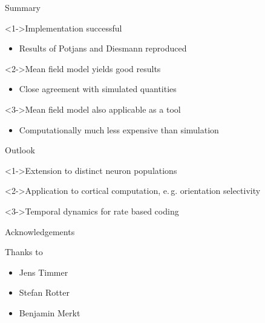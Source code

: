 \documentclass[xcolor=x11names,compress]{beamer}
\renewcommand{\(}{\begin{columns}}
\renewcommand{\)}{\end{columns}}
\newcommand{\<}[1]{\begin{column}{#1}}
\renewcommand{\>}{\end{column}}
\begin{document}
\begin{frame}[t]{Summary}
    \begin{block}<1->{Implementation successful}
        \begin{itemize}
            \item 
        Results of Potjans and Diesmann reproduced
        \end{itemize}
    \end{block}
    \vfill
    \begin{block}<2->{Mean field model yields good results}
        \begin{itemize}
            \item 
        Close agreement with simulated quantities
        \end{itemize}
    \end{block}
    \vfill
    \begin{block}<3->{Mean field model also applicable as a tool}
        \begin{itemize}
            \item 
        Computationally much less expensive than simulation
        \end{itemize}
    \end{block}
\end{frame}

\begin{frame}[t]{Outlook}
    \begin{block}<1->{Extension to distinct neuron populations}
    \end{block}
    \vfill
    \begin{block}<2->{Application to cortical computation, e.\,g. orientation selectivity}
    \end{block}
    \vfill
    \begin{block}<3->{Temporal dynamics for rate based coding}
    \end{block}
\end{frame}


\begin{frame}[t]{Acknowledgements}
    \begin{block}{Thanks to}
        \begin{itemize}
            \item Jens Timmer 
            \item Stefan Rotter
            \item Benjamin Merkt 
        \end{itemize}
    \end{block}
\end{frame}
\end{document}
